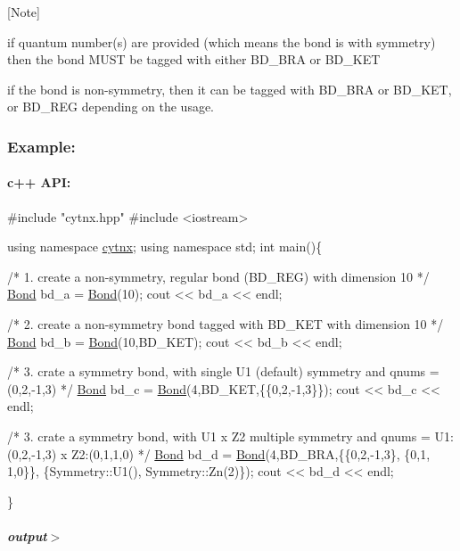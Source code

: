 \mbox{[}Note\mbox{]}
\begin{DoxyEnumerate}
\item if quantum number(s) are provided (which means the bond is with symmetry) then the bond M\+U\+ST be tagged with either B\+D\+\_\+\+B\+RA or B\+D\+\_\+\+K\+ET
\item if the bond is non-\/symmetry, then it can be tagged with B\+D\+\_\+\+B\+RA or B\+D\+\_\+\+K\+ET, or B\+D\+\_\+\+R\+EG depending on the usage.
\end{DoxyEnumerate}

\subsubsection*{Example\+:}

\paragraph*{c++ A\+PI\+:}


\begin{DoxyCodeInclude}
\textcolor{preprocessor}{#include "cytnx.hpp"}
\textcolor{preprocessor}{#include <iostream>}


\textcolor{keyword}{using namespace }\hyperlink{namespacecytnx}{cytnx};
\textcolor{keyword}{using namespace }std;
\textcolor{keywordtype}{int} main()\{ 

    \textcolor{comment}{/* 1.}
\textcolor{comment}{        create a non-symmetry, regular bond (BD\_REG) }
\textcolor{comment}{        with dimension 10}
\textcolor{comment}{    */}
    \hyperlink{classcytnx_1_1Bond}{Bond} bd\_a = \hyperlink{classcytnx_1_1Bond}{Bond}(10);
    cout << bd\_a << endl;

    \textcolor{comment}{/* 2. }
\textcolor{comment}{        create a non-symmetry bond tagged with BD\_KET }
\textcolor{comment}{        with dimension 10}
\textcolor{comment}{    */}
    \hyperlink{classcytnx_1_1Bond}{Bond} bd\_b = \hyperlink{classcytnx_1_1Bond}{Bond}(10,BD\_KET);
    cout << bd\_b << endl;

    \textcolor{comment}{/* 3.}
\textcolor{comment}{        crate a symmetry bond, }
\textcolor{comment}{        with single U1 (default) symmetry and qnums = (0,2,-1,3)}
\textcolor{comment}{    */}
    \hyperlink{classcytnx_1_1Bond}{Bond} bd\_c = \hyperlink{classcytnx_1_1Bond}{Bond}(4,BD\_KET,\{\{0,2,-1,3\}\});
    cout << bd\_c << endl;

    \textcolor{comment}{/* 3.}
\textcolor{comment}{        crate a symmetry bond, }
\textcolor{comment}{        with U1 x Z2 multiple symmetry }
\textcolor{comment}{        and qnums = U1:(0,2,-1,3) x Z2:(0,1,1,0)}
\textcolor{comment}{    */}
    \hyperlink{classcytnx_1_1Bond}{Bond} bd\_d = \hyperlink{classcytnx_1_1Bond}{Bond}(4,BD\_BRA,\{\{0,2,-1,3\},
                               \{0,1, 1,0\}\},
                              \{Symmetry::U1(),
                               Symmetry::Zn(2)\});
    cout << bd\_d << endl;

    
    


\}

\end{DoxyCodeInclude}
 \subparagraph*{output$>$}


